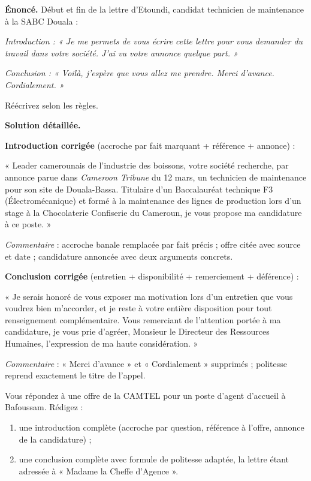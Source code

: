 \documentclass[11pt]{article}
\begin{document}
\begin{exoresolu}
\textbf{Énoncé.} Début et fin de la lettre d'Etoundi, candidat technicien de maintenance à la SABC Douala :

\emph{Introduction : « Je me permets de vous écrire cette lettre pour vous demander du travail dans votre société. J'ai vu votre annonce quelque part. »}

\emph{Conclusion : « Voilà, j'espère que vous allez me prendre. Merci d'avance. Cordialement. »}

Réécrivez selon les règles.

\tcblower
\textbf{Solution détaillée.}

\textbf{Introduction corrigée} (accroche par fait marquant + référence + annonce) :

« Leader camerounais de l'industrie des boissons, votre société recherche, par annonce parue dans \emph{Cameroon Tribune} du 12 mars, un technicien de maintenance pour son site de Douala-Bassa. Titulaire d'un Baccalauréat technique F3 (Électromécanique) et formé à la maintenance des lignes de production lors d'un stage à la Chocolaterie Confiserie du Cameroun, je vous propose ma candidature à ce poste. »

\textit{Commentaire} : accroche banale remplacée par fait précis ; offre citée avec source et date ; candidature annoncée avec deux arguments concrets.

\textbf{Conclusion corrigée} (entretien + disponibilité + remerciement + déférence) :

« Je serais honoré de vous exposer ma motivation lors d'un entretien que vous voudrez bien m'accorder, et je reste à votre entière disposition pour tout renseignement complémentaire. Vous remerciant de l'attention portée à ma candidature, je vous prie d'agréer, Monsieur le Directeur des Ressources Humaines, l'expression de ma haute considération. »

\textit{Commentaire} : « Merci d'avance » et « Cordialement » supprimés ; politesse reprend exactement le titre de l'appel.
\end{exoresolu}

\begin{exercice}
Vous répondez à une offre de la CAMTEL pour un poste d'agent d'accueil à Bafoussam. Rédigez :
\begin{enumerate}
\item une introduction complète (accroche par question, référence à l'offre, annonce de la candidature) ;
\item une conclusion complète avec formule de politesse adaptée, la lettre étant adressée à « Madame la Cheffe d'Agence ».
\end{enumerate}
\end{exercice}
\end{document}
